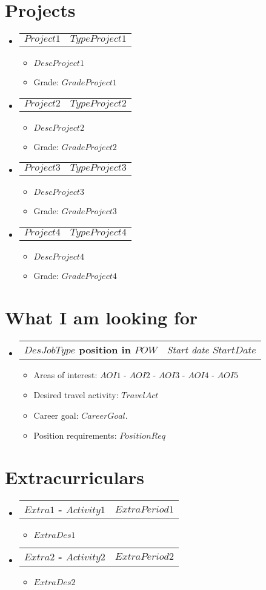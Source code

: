\documentclass[letterpaper,11pt]{article}
\makeatletter
\newcommand{\resumeItem}[1]{
  \item\small{
    {#1 \vspace{-2pt}}
  }
}
\newcommand{\resumeProjectHeading}[2]{
    \item
    \begin{tabular*}{0.97\textwidth}{l@{\extracolsep{\fill}}r}
      \small#1 & \textit{#2} \\
    \end{tabular*}\vspace{-7pt}
}
\newcommand{\resumeSubHeadingListStart}{\begin{itemize}[leftmargin=0.15in,rightmargin=1.8in, leftmargin=0.15in, label={}]}
\newcommand{\resumeSubHeadingListEnd}{\end{itemize}}
\newcommand{\resumeItemListStart}{\begin{itemize}\justifying}
\newcommand{\resumeItemListEnd}{\end{itemize}\vspace{-5pt}}
\makeatother
\begin{document}
\section{Projects}
    \resumeSubHeadingListStart
      \resumeProjectHeading
          {\textbf{$Project1$}}{$TypeProject1$}
          \resumeItemListStart
            \resumeItem{$DescProject1$}
        \resumeItem{Grade: $GradeProject1$}
          \resumeItemListEnd
      \resumeProjectHeading
          {\textbf{$Project2$}}{$TypeProject2$}
          \resumeItemListStart
            \resumeItem{$DescProject2$}
        \resumeItem{Grade: $GradeProject2$}
          \resumeItemListEnd
      \resumeProjectHeading
          {\textbf{$Project3$}}{$TypeProject3$}
          \resumeItemListStart
            \resumeItem{$DescProject3$}
        \resumeItem{Grade: $GradeProject3$}
          \resumeItemListEnd
      \resumeProjectHeading
          {\textbf{$Project4$}}{$TypeProject4$}
          \resumeItemListStart
            \resumeItem{$DescProject4$}
        \resumeItem{Grade: $GradeProject4$}
          \resumeItemListEnd

    \resumeSubHeadingListEnd


\section{What I am looking for}
    \resumeSubHeadingListStart
      \resumeProjectHeading
          {\textbf{$DesJobType$ position in $POW$}}{\textit{\small Start date $StartDate$}}
          \resumeItemListStart
            \resumeItem{Areas of interest: $AOI1$ - $AOI2$  - $AOI3$  - $AOI4$  - $AOI5$ }
        \resumeItem{Desired travel activity: $TravelAct$}
        \resumeItem{Career goal: $CareerGoal$.}
        \resumeItem{Position requirements: $PositionReq$}
          \resumeItemListEnd
    \resumeSubHeadingListEnd


%
\section{Extracurriculars}
    \resumeSubHeadingListStart
      \resumeProjectHeading
          {\textbf{$Extra1$ - $Activity1$}}
          {$ExtraPeriod1$}
          \resumeItemListStart
            \resumeItem{$ExtraDes1$}
          \resumeItemListEnd
      \resumeProjectHeading
          {\textbf{$Extra2$ - $Activity2$}}{$ExtraPeriod2$}
          \resumeItemListStart
            \resumeItem{$ExtraDes2$}
          \resumeItemListEnd
    \resumeSubHeadingListEnd
 
\end{document}
